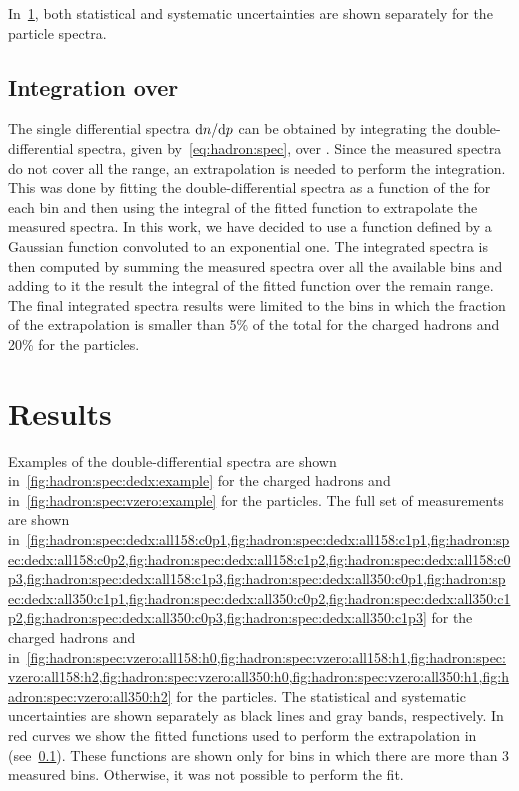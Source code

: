 In~\cref{sec:hadron:results}, both statistical and systematic uncertainties
are shown separately for the particle spectra.

\subsection[Integration over \pT]{\boldmath Integration over \pT}
\label{sec:hadron:spec:int}


The single differential spectra $\text{d}n/\text{d}p$ can be obtained
by integrating the double-differential spectra,
given by~\cref{eq:hadron:spec}, over \pT. Since the measured
spectra do not cover all the \pT range, an extrapolation is needed
to perform the integration. This was done by fitting
the double-differential spectra as a function of the \pT for each \pp bin
and then using the integral of the fitted function to
extrapolate the measured spectra.  
In this work, we have decided to use a function
defined by a Gaussian function convoluted to
an exponential one. 
The \pT integrated spectra is then computed by summing
the measured spectra over all the available \pT bins
and adding to it the result the integral of the fitted function
over the remain \pT range. The final \pT integrated spectra results
were limited to the \pp bins in which the fraction of the extrapolation
is smaller than 5\% of the total for the charged hadrons and 20\% for the \vzero particles.


\section{Results}
\label{sec:hadron:results}

Examples of the double-differential spectra are shown
in~\cref{fig:hadron:spec:dedx:example} for the charged hadrons
and in~\cref{fig:hadron:spec:vzero:example}
for the \vzero particles. The full set of measurements
are shown
in~\cref{fig:hadron:spec:dedx:all158:c0p1,fig:hadron:spec:dedx:all158:c1p1,fig:hadron:spec:dedx:all158:c0p2,fig:hadron:spec:dedx:all158:c1p2,fig:hadron:spec:dedx:all158:c0p3,fig:hadron:spec:dedx:all158:c1p3,fig:hadron:spec:dedx:all350:c0p1,fig:hadron:spec:dedx:all350:c1p1,fig:hadron:spec:dedx:all350:c0p2,fig:hadron:spec:dedx:all350:c1p2,fig:hadron:spec:dedx:all350:c0p3,fig:hadron:spec:dedx:all350:c1p3}
for the charged hadrons and
in~\cref{fig:hadron:spec:vzero:all158:h0,fig:hadron:spec:vzero:all158:h1,fig:hadron:spec:vzero:all158:h2,fig:hadron:spec:vzero:all350:h0,fig:hadron:spec:vzero:all350:h1,fig:hadron:spec:vzero:all350:h2}
for the \vzero particles.
The statistical and systematic uncertainties are shown
separately as black lines and gray bands, respectively.
In red curves we show the fitted functions used to perform
the extrapolation in \pT (see~\cref{sec:hadron:spec:int}).
These functions are shown only for \pp bins in which
there are more than 3 measured \pT bins. Otherwise,
it was not possible to perform the fit.


